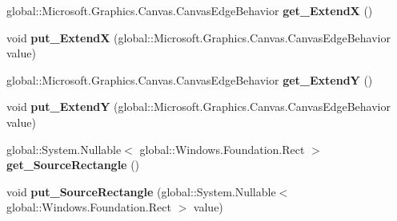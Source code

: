 \begin{DoxyCompactItemize}
\item 
\mbox{\label{interface_microsoft_1_1_graphics_1_1_canvas_1_1_brushes_1_1_i_canvas_image_brush_aa972b7d23b8fc1eb398d518a07940b35}} 
global\+::\+Microsoft.\+Graphics.\+Canvas.\+Canvas\+Edge\+Behavior {\bfseries get\+\_\+\+ExtendX} ()
\item 
\mbox{\label{interface_microsoft_1_1_graphics_1_1_canvas_1_1_brushes_1_1_i_canvas_image_brush_a5355b52f83105ebc903d8a09622319eb}} 
void {\bfseries put\+\_\+\+ExtendX} (global\+::\+Microsoft.\+Graphics.\+Canvas.\+Canvas\+Edge\+Behavior value)
\item 
\mbox{\label{interface_microsoft_1_1_graphics_1_1_canvas_1_1_brushes_1_1_i_canvas_image_brush_aa40db9376b341ac0233a6f2984cff951}} 
global\+::\+Microsoft.\+Graphics.\+Canvas.\+Canvas\+Edge\+Behavior {\bfseries get\+\_\+\+ExtendY} ()
\item 
\mbox{\label{interface_microsoft_1_1_graphics_1_1_canvas_1_1_brushes_1_1_i_canvas_image_brush_a02ac0206445780a5997e968f76eeb0f0}} 
void {\bfseries put\+\_\+\+ExtendY} (global\+::\+Microsoft.\+Graphics.\+Canvas.\+Canvas\+Edge\+Behavior value)
\item 
\mbox{\label{interface_microsoft_1_1_graphics_1_1_canvas_1_1_brushes_1_1_i_canvas_image_brush_abd99fb761de06f6a5a4446147e3b0dee}} 
global\+::\+System.\+Nullable$<$ global\+::\+Windows.\+Foundation.\+Rect $>$ {\bfseries get\+\_\+\+Source\+Rectangle} ()
\item 
\mbox{\label{interface_microsoft_1_1_graphics_1_1_canvas_1_1_brushes_1_1_i_canvas_image_brush_a18db26edd67cb06b7b78f0e7709c8806}} 
void {\bfseries put\+\_\+\+Source\+Rectangle} (global\+::\+System.\+Nullable$<$ global\+::\+Windows.\+Foundation.\+Rect $>$ value)
\item 
\mbox{\label{interface_microsoft_1_1_graphics_1_1_canvas_1_1_brushes_1_1_i_canvas_image_brush_aebd2633bbc018c5fc49fd70e6a24fed8}} 

\end{DoxyCompactItemize}
